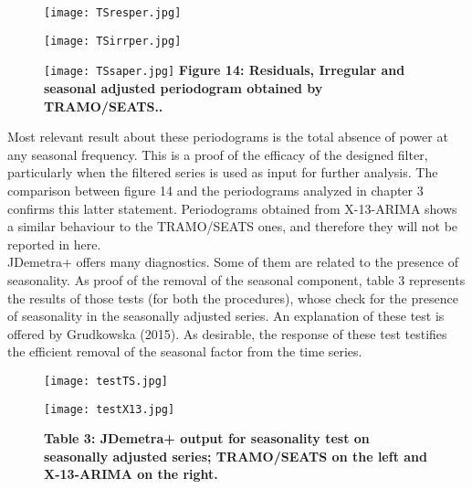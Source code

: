 \documentclass{article}
\begin{document}
\begin{figure}[H]
  \texttt{[image: TSresper.jpg]}
  \label{fig:1}
\end{figure}
\begin{figure}[H]
  \texttt{[image: TSirrper.jpg]}
  \label{fig:1}
\end{figure} 
\begin{figure}[H]
  \texttt{[image: TSsaper.jpg]}
  {\textbf{\scriptsize Figure 14: Residuals, Irregular and seasonal adjusted periodogram obtained by TRAMO/SEATS..}}
  \label{fig:1}
\end{figure}
Most relevant result about these periodograms is the total absence of power at any seasonal frequency. This is a proof of the efficacy of the designed filter, particularly when the filtered series is used as input for further analysis. The comparison between figure 14 and the periodograms analyzed in chapter 3 confirms this latter statement. Periodograms obtained from X-13-ARIMA shows a similar behaviour to the TRAMO/SEATS ones, and therefore they will not be reported in here.\\JDemetra+ offers many diagnostics. Some of them are related to the presence of seasonality. As proof of the removal of the seasonal component, table 3 represents the results of those tests (for both the procedures), whose check for the presence of seasonality in the seasonally adjusted series. An explanation of these test is offered by Grudkowska (2015). As desirable, the response of these test testifies the efficient removal of the seasonal factor from the time series.
\begin{figure}[H]
  \begin{minipage}[b]{0.5\textwidth}
    \texttt{[image: testTS.jpg]}
  \end{minipage}
  \hfill
  \begin{minipage}[b]{0.5\textwidth}
    \texttt{[image: testX13.jpg]}
  \end{minipage}
  {\textbf{\scriptsize Table 3: JDemetra+ output for seasonality test on seasonally adjusted series; TRAMO/SEATS on the left and X-13-ARIMA on the right.}}
\end{figure}
\end{document}
